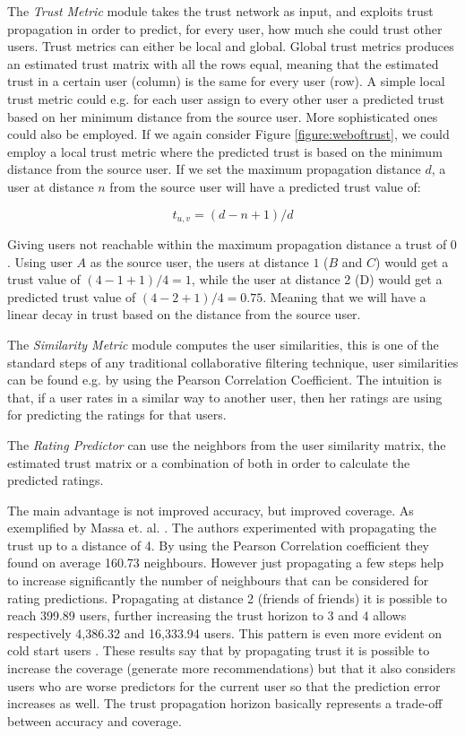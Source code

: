 The \emph{Trust Metric} module takes the trust network as input, and exploits
trust propagation in order to predict, for every user, how much she could trust
other users. Trust metrics can either be local and global. Global trust metrics
produces an estimated trust matrix with all the rows equal, meaning that the
estimated trust in a certain user (column) is the same for every user (row). A
simple local trust metric could e.g. for each user assign to every other user a
predicted trust based on her minimum distance from the source user. More
sophisticated ones could also be employed. If we again consider Figure
\ref{figure:weboftrust}, we could employ a local trust metric where the
predicted trust is based on the minimum distance from the source user. If we
set the maximum propagation distance $d$, a user at distance $n$ from the
source user will have a predicted trust value of:

\begin{equation}
t_{u,v} = (d-n+1)/d
\end{equation}

Giving users not reachable within the maximum propagation distance a trust of
$0$. Using user $A$ as the source user, the users at distance $1$ ($B$ and $C$)
would get a trust value of $(4-1+1)/4 = 1$, while the user at distance 2 (D)
would get a predicted trust value of $(4-2+1)/4 = 0.75$. Meaning that we will
have a linear decay in trust based on the distance from the source user.

The \emph{Similarity Metric} module computes the user similarities, this is one
of the standard steps of any traditional collaborative filtering technique,
user similarities can be found e.g. by using the Pearson Correlation
Coefficient. The intuition is that, if a user rates in a similar way to another
user, then her ratings are using for predicting the ratings for that users.

The \emph{Rating Predictor} can use the neighbors from the user similarity
matrix, the estimated trust matrix or a combination of both in order to
calculate the predicted ratings.

The main advantage is not improved accuracy, but improved coverage. As
exemplified by Massa et. al. \cite{Massa2007}. The authors experimented with
propagating the trust up to a distance of 4. By using the Pearson Correlation
coefficient they found on average 160.73 neighbours. However just propagating a
few steps help to increase significantly the number of neighbours that can be
considered for rating predictions. Propagating at distance 2 (friends of
friends) it is possible to reach 399.89 users, further increasing the trust
horizon to 3 and 4 allows respectively 4,386.32 and 16,333.94 users. This
pattern is even more evident on cold start users \cite{Massa2004}. These
results say that by propagating trust it is possible to increase the coverage
(generate more recommendations) but that it also considers users who are worse
predictors for the current user so that the prediction error increases as well.
The trust propagation horizon basically represents a trade-off between accuracy
and coverage.

